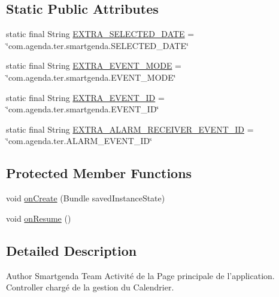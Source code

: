 \subsection*{Static Public Attributes}
\begin{DoxyCompactItemize}
\item 
static final String \hyperlink{classcom_1_1agenda_1_1ter_1_1smartgenda_1_1_calendar_activity_a29abe4db6b74d419544044cf40ef6b01}{E\-X\-T\-R\-A\-\_\-\-S\-E\-L\-E\-C\-T\-E\-D\-\_\-\-D\-A\-T\-E} = \char`\"{}com.\-agenda.\-ter.\-smartgenda.\-S\-E\-L\-E\-C\-T\-E\-D\-\_\-\-D\-A\-T\-E\char`\"{}
\item 
static final String \hyperlink{classcom_1_1agenda_1_1ter_1_1smartgenda_1_1_calendar_activity_a81bbde4b954d1e113b2152a6246e3770}{E\-X\-T\-R\-A\-\_\-\-E\-V\-E\-N\-T\-\_\-\-M\-O\-D\-E} = \char`\"{}com.\-agenda.\-ter.\-smartgenda.\-E\-V\-E\-N\-T\-\_\-\-M\-O\-D\-E\char`\"{}
\item 
static final String \hyperlink{classcom_1_1agenda_1_1ter_1_1smartgenda_1_1_calendar_activity_aaca7a35a186119bf799ac2518ddb1062}{E\-X\-T\-R\-A\-\_\-\-E\-V\-E\-N\-T\-\_\-\-I\-D} = \char`\"{}com.\-agenda.\-ter.\-smartgenda.\-E\-V\-E\-N\-T\-\_\-\-I\-D\char`\"{}
\item 
static final String \hyperlink{classcom_1_1agenda_1_1ter_1_1smartgenda_1_1_calendar_activity_ad1888ad1bb24f0db782c540384106f1e}{E\-X\-T\-R\-A\-\_\-\-A\-L\-A\-R\-M\-\_\-\-R\-E\-C\-E\-I\-V\-E\-R\-\_\-\-E\-V\-E\-N\-T\-\_\-\-I\-D} = \char`\"{}com.\-agenda.\-ter.\-A\-L\-A\-R\-M\-\_\-\-E\-V\-E\-N\-T\-\_\-\-I\-D\char`\"{}
\end{DoxyCompactItemize}
\subsection*{Protected Member Functions}
\begin{DoxyCompactItemize}
\item 
void \hyperlink{classcom_1_1agenda_1_1ter_1_1smartgenda_1_1_calendar_activity_a8bd28bbf33ea614c5929f1c32ddd849a}{on\-Create} (Bundle saved\-Instance\-State)
\item 
void \hyperlink{classcom_1_1agenda_1_1ter_1_1smartgenda_1_1_calendar_activity_a0d798d92ddaf73d1035ea47e48ae12c3}{on\-Resume} ()
\end{DoxyCompactItemize}


\subsection{Detailed Description}
\begin{DoxyAuthor}{Author}
Smartgenda Team Activité de la Page principale de l'application. Controller chargé de la gestion du Calendrier. 
\end{DoxyAuthor}


